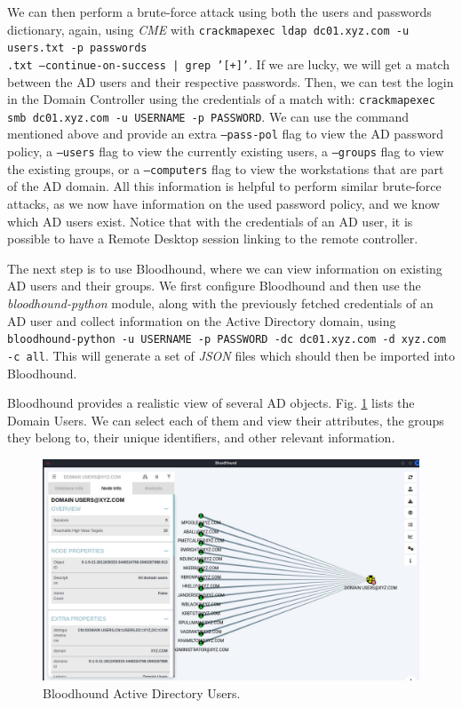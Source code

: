 We can then perform a brute-force attack using both the users and passwords dictionary, again, using \textit{CME} with \texttt{crackmapexec ldap dc01.xyz.com -u users.txt -p passwords\\.txt ---continue-on-success | grep '[+]'}. If we are lucky, we will get a match between the AD users and their respective passwords. Then, we can test the login in the Domain Controller using the credentials of a match with: \texttt{crackmapexec smb dc01.xyz.com -u USERNAME -p PASSWORD}. We can use the command mentioned above and provide an extra \texttt{---pass-pol} flag to view the AD password policy, a \texttt{---users} flag to view the currently existing users, a \texttt{---groups} flag to view the existing groups, or a \texttt{---computers} flag to view the workstations that are part of the AD domain. All this information is helpful to perform similar brute-force attacks, as we now have information on the used password policy, and we know which AD users exist. Notice that with the credentials of an AD user, it is possible to have a Remote Desktop session linking to the remote controller.

The next step is to use Bloodhound, where we can view information on existing AD users and their groups. We first configure Bloodhound and then use the \textit{bloodhound-python} module, along with the previously fetched credentials of an AD user and collect information on the Active Directory domain, using \texttt{bloodhound-python -u USERNAME -p PASSWORD -dc dc01.xyz.com -d xyz.com -c all}. This will generate a set of \textit{JSON} files which should then be imported into Bloodhound.

Bloodhound provides a realistic view of several AD objects. Fig. \ref{fig:bloodhound_ad_users} lists the Domain Users. We can select each of them and view their attributes, the groups they belong to, their unique identifiers, and other relevant information.

\begin{figure}[H]
    \includegraphics[width=12cm]{figures/bloodhound_ad_users.png}
    \caption{Bloodhound Active Directory Users.}
    \label{fig:bloodhound_ad_users}
\end{figure}

